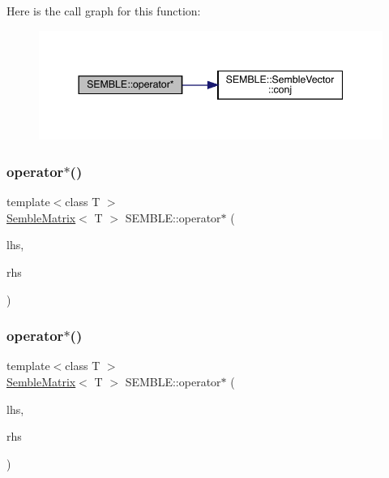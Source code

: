 Here is the call graph for this function\+:
\nopagebreak
\begin{figure}[H]
\begin{center}
\leavevmode
\includegraphics[width=344pt]{d7/dfd/namespaceSEMBLE_a6edaf00d285c6d4509505f30c27df7ec_cgraph}
\end{center}
\end{figure}
\mbox{\label{namespaceSEMBLE_a6158819356a4efaf5146550ba7433038}} 
\subsubsection{\texorpdfstring{operator$\ast$()}{operator*()}\hspace{0.1cm}{\footnotesize\ttfamily [12/20]}}
{\footnotesize\ttfamily template$<$class T $>$ \\
\mbox{\hyperlink{structSEMBLE_1_1SembleMatrix}{Semble\+Matrix}}$<$ T $>$ S\+E\+M\+B\+L\+E\+::operator$\ast$ (\begin{DoxyParamCaption}\item[{const \mbox{\hyperlink{structSEMBLE_1_1SembleMatrix}{Semble\+Matrix}}$<$ T $>$ \&}]{lhs,  }\item[{const T \&}]{rhs }\end{DoxyParamCaption})}

\mbox{\label{namespaceSEMBLE_a08ce1d5bbc51eda6e5d2a27727f8779c}} 
\subsubsection{\texorpdfstring{operator$\ast$()}{operator*()}\hspace{0.1cm}{\footnotesize\ttfamily [13/20]}}
{\footnotesize\ttfamily template$<$class T $>$ \\
\mbox{\hyperlink{structSEMBLE_1_1SembleMatrix}{Semble\+Matrix}}$<$ T $>$ S\+E\+M\+B\+L\+E\+::operator$\ast$ (\begin{DoxyParamCaption}\item[{const T \&}]{lhs,  }\item[{const \mbox{\hyperlink{structSEMBLE_1_1SembleMatrix}{Semble\+Matrix}}$<$ T $>$ \&}]{rhs }\end{DoxyParamCaption})}

